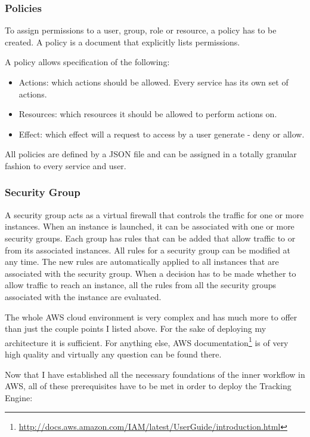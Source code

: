 \subsubsection*{Policies}

To assign permissions to a user, group, role or resource, a policy has to be created. A policy is a document that explicitly lists permissions.

A policy allows specification of the following:

\begin{itemize}
	\item Actions: which actions should be allowed. Every service has its own set of actions.
	\item Resources: which resources it should be allowed to perform actions on.
	\item Effect: which effect will a request to access by a user generate - deny or allow.
\end{itemize}

All policies are defined by a JSON file and can be assigned in a totally granular fashion to every service and user.


\subsubsection*{Security Group}

A security group acts as a virtual firewall that controls the traffic for one or more instances. When an instance is launched, it can be associated with one or more security groups. Each group has rules that can be added that allow traffic to or from its associated instances. All rules for a security group can be modified at any time. The new rules are automatically applied to all instances that are associated with the security group. When a decision has to be made whether to allow traffic to reach an instance, all the rules from all the security groups associated with the instance are evaluated.

\bigbreak

The whole AWS cloud environment is very complex and has much more to offer than just the couple points I listed above. For the sake of deploying my architecture it is sufficient. For anything else, AWS documentation\footnote{\url{http://docs.aws.amazon.com/IAM/latest/UserGuide/introduction.html}} is of very high quality and virtually any question can be found there.

\newpage

Now that I have established all the necessary foundations of the inner workflow in AWS, all of these prerequisites have to be met in order to deploy the Tracking Engine:

